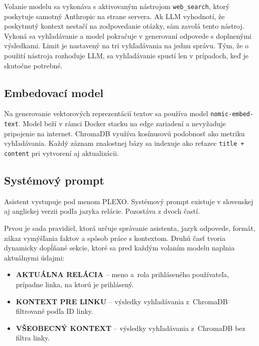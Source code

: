 Volanie modelu sa vykonáva s aktivovaným nástrojom \texttt{web\_search}, ktorý
poskytuje samotný Anthropic na strane servera. Ak LLM vyhodnotí, že poskytnutý
kontext nestačí na zodpovedanie otázky, sám zavolá tento nástroj. Vykoná sa
vyhľadávanie a model pokračuje v generovaní odpovede s doplnenými výsledkami.
Limit je nastavený na tri vyhľadávania na jednu správu. Tým, že o použití
nástroja rozhoduje LLM, sa vyhľadávanie spustí len v prípadoch, keď je skutočne
potrebné.

\subsection{Embedovací model}

Na generovanie vektorových reprezentácií textov sa používa model
\texttt{nomic-embed-text}. Model beží v rámci Docker stacku na edge zariadení a
nevyžaduje pripojenie na internet. ChromaDB využíva kosínusovú podobnosť ako
metriku vyhľadávania. Každý záznam znalostnej bázy sa indexuje ako reťazec
\texttt{title + content} pri vytvorení aj aktualizácii.

\subsection{Systémový prompt}

Asistent vystupuje pod menom PLEXO. Systémový prompt existuje v slovenskej aj
anglickej verzii podľa jazyka relácie. Pozostáva z dvoch častí. 

Prvou je sada
pravidiel, ktorá určuje správanie asistenta, jazyk odpovede, formát, zákaz
vymýšľania faktov a spôsob práce s kontextom. 
\newpage
Druhú časť tvoria dynamicky
dopĺňané sekcie, ktoré sa pred každým volaním modelu naplnia aktuálnymi údajmi:

\begin{itemize}
      \item \textbf{AKTUÁLNA RELÁCIA} -- meno a~rola prihláseného používateľa,
            prípadne linka, na ktorú je prihlásený.
      \item \textbf{KONTEXT PRE LINKU} -- výsledky vyhľadávania z~ChromaDB
            filtrované podľa ID linky.
      \item \textbf{VŠEOBECNÝ KONTEXT} -- výsledky vyhľadávania z~ChromaDB bez
            filtra linky.
\end{itemize}

